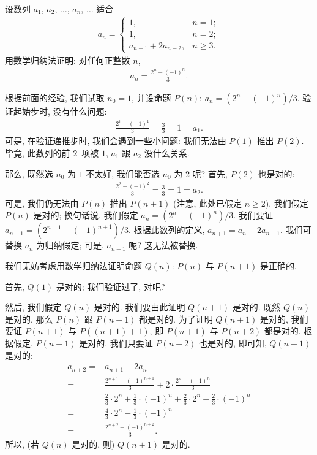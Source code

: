 \documentclass[%
    UTF8,%
    fontset=none,%
    punct=kaiming,%
    zihao=-4,%
    a4paper,%
    oneside,%
]{ctexbook}
\let\emph\relax
\renewcommand*{\geq}{\geqslant}
\begin{document}
\begin{example}
    设数列 \(a_1\), \(a_2\), \(\dots\), \(a_n\), \(\dots\) 适合
    \begin{align*}
        a_n =
        \begin{cases}
            1,                  & n = 1;    \\
            1,                  & n = 2;    \\
            a_{n-1} + 2a_{n-2}, & n \geq 3.
        \end{cases}
    \end{align*}
    用数学归纳法证明:
    对任何正整数 \(n\),
    \begin{align*}
        a_n = \frac{2^n - (-1)^n}{3}.
    \end{align*}

    根据前面的经验,
    我们试取 \(n_0 = 1\),
    并设命题 \(P(n)\): \(a_n = (2^n - (-1)^n)/3\).
    验证起始步时, 没有什么问题:
    \begin{align*}
        \frac{2^1 - (-1)^1}{3} = \frac{3}{3} = 1 = a_1.
    \end{align*}
    可是, 在验证递推步时,
    我们会遇到一些小问题:
    我们无法由 \(P(1)\) 推出 \(P(2)\).
    毕竟, 此数列的前 \(2\)~项被\emph{定义为} \(1\),
    \(a_1\) 跟 \(a_2\) 没什么关系.

    那么, 既然选 \(n_0\) 为 \(1\) 不太好,
    我们能否选 \(n_0\) 为 \(2\) 呢?
    首先, \(P(2)\) 也是对的:
    \begin{align*}
        \frac{2^2 - (-1)^2}{3} = \frac{3}{3} = 1 = a_2.
    \end{align*}
    可是,
    我们仍无法由 \(P(n)\) 推出 \(P(n+1)\)
    (注意, 此处已假定 \(n \geq 2\)).
    我们假定 \(P(n)\) 是对的;
    换句话说, 我们假定 \(a_n = (2^n - (-1)^n)/3\).
    我们要证 \(a_{n+1} = (2^{n+1} - (-1)^{n+1})/3\).
    根据此数列的定义,
    \(a_{n+1} = a_n + 2a_{n-1}\).
    我们可替换 \(a_n\) 为归纳假定;
    可是, \(a_{n-1}\) 呢?
    这无法被替换.

    我们无妨考虑用数学归纳法证明命题
    \(Q(n)\):
    \(P(n)\) 与 \(P(n+1)\) 是正确的.

    首先, \(Q(1)\) 是对的; 我们验证过了, 对吧?

    然后, 我们假定 \(Q(n)\) 是对的.
    我们要由此证明 \(Q(n+1)\) 是对的.
    既然 \(Q(n)\) 是对的, 那么 \(P(n)\) 跟 \(P(n+1)\) 都是对的.
    为了证明 \(Q(n+1)\) 是对的, 我们要证
    \(P(n+1)\) 与 \(P((n+1)+1)\),
    即 \(P(n+1)\) 与 \(P(n+2)\) 都是对的.
    根据假定, \(P(n+1)\) 是对的.
    我们只要证 \(P(n+2)\) 也是对的,
    即可知, \(Q(n+1)\) 是对的:
    \begin{align*}
        a_{n+2}
        = {} & a_{n+1} + 2a_n
        \\
        = {} & \frac{2^{n+1} - (-1)^{n+1}}{3}
        + 2 \cdot \frac{2^n - (-1)^n}{3}
        \\
        = {} & \frac{2}{3} \cdot 2^n + \frac{1}{3} \cdot (-1)^n
        + \frac{2}{3} \cdot 2^n - \frac{2}{3} \cdot (-1)^n
        \\
        = {} & \frac{4}{3} \cdot 2^n - \frac{1}{3} \cdot (-1)^n
        \\
        = {} & \frac{2^{n+2} - (-1)^{n+2}}{3}.
    \end{align*}
    所以, (若 \(Q(n)\) 是对的, 则) \(Q(n+1)\) 是对的.


\end{example}
\end{document}
